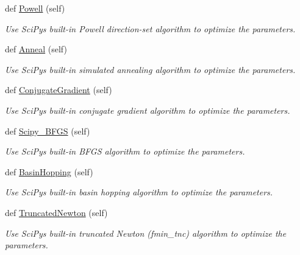 \begin{DoxyCompactItemize}
def \hyperlink{classsrc_1_1optimizer_1_1Optimizer_aba1d50ad4756203f83a5be844972f0a2}{Powell} (self)
\begin{DoxyCompactList}\small\item\em Use Sci\+Py\textquotesingle{}s built-\/in Powell direction-\/set algorithm to optimize the parameters. \end{DoxyCompactList}\item 
def \hyperlink{classsrc_1_1optimizer_1_1Optimizer_a6a7b8b8996d2b054d0cfa24c88e7d0f4}{Anneal} (self)
\begin{DoxyCompactList}\small\item\em Use Sci\+Py\textquotesingle{}s built-\/in simulated annealing algorithm to optimize the parameters. \end{DoxyCompactList}\item 
def \hyperlink{classsrc_1_1optimizer_1_1Optimizer_a6b8bc81ae670b40040d07ae09ccdb7a2}{Conjugate\+Gradient} (self)
\begin{DoxyCompactList}\small\item\em Use Sci\+Py\textquotesingle{}s built-\/in conjugate gradient algorithm to optimize the parameters. \end{DoxyCompactList}\item 
def \hyperlink{classsrc_1_1optimizer_1_1Optimizer_aff37f4cc60afa2eced61c258e4eed859}{Scipy\+\_\+\+B\+F\+GS} (self)
\begin{DoxyCompactList}\small\item\em Use Sci\+Py\textquotesingle{}s built-\/in B\+F\+GS algorithm to optimize the parameters. \end{DoxyCompactList}\item 
def \hyperlink{classsrc_1_1optimizer_1_1Optimizer_a5ba1a8a4ea6dd488697e647b8aa2228a}{Basin\+Hopping} (self)
\begin{DoxyCompactList}\small\item\em Use Sci\+Py\textquotesingle{}s built-\/in basin hopping algorithm to optimize the parameters. \end{DoxyCompactList}\item 
def \hyperlink{classsrc_1_1optimizer_1_1Optimizer_aba52ed682c83784e4523223c0bbb018b}{Truncated\+Newton} (self)
\begin{DoxyCompactList}\small\item\em Use Sci\+Py\textquotesingle{}s built-\/in truncated Newton (fmin\+\_\+tnc) algorithm to optimize the parameters. \end{DoxyCompactList}\item 

\end{DoxyCompactItemize}
